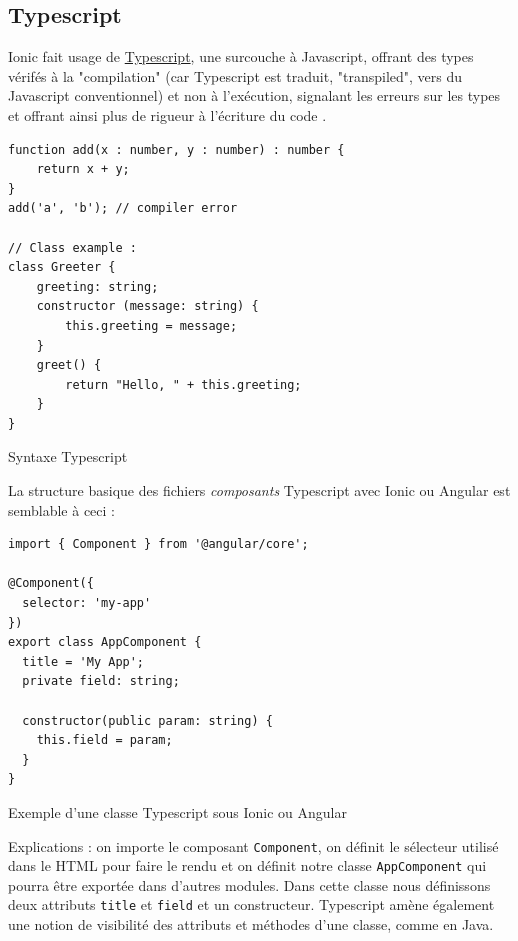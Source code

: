 \documentclass[a4paper, 12pt]{article}
\newenvironment{code}{\captionsetup{type=listing}}{}
\begin{document}
\subsection{Typescript}
Ionic fait usage de \href{http://www.typescriptlang.org/}{Typescript}, une surcouche à Javascript, offrant des types
vérifés à la "compilation" (car Typescript est traduit, "transpiled", vers du Javascript conventionnel) et non à
l'exécution, signalant les erreurs sur les types et offrant ainsi plus de rigueur à l'écriture du code \cite{ref12}.
\begin{code}
    \begin{verbatim}
function add(x : number, y : number) : number {
    return x + y;
}
add('a', 'b'); // compiler error

// Class example :
class Greeter {
    greeting: string;
    constructor (message: string) {
        this.greeting = message;
    }
    greet() {
        return "Hello, " + this.greeting;
    }
}
    \end{verbatim}
    \caption{Syntaxe Typescript}
\end{code}
La structure basique des fichiers \textit{composants} Typescript avec Ionic ou Angular est semblable à ceci :
\\
\begin{code}
    \begin{verbatim}
import { Component } from '@angular/core';

@Component({
  selector: 'my-app'
})
export class AppComponent {
  title = 'My App';
  private field: string;

  constructor(public param: string) {
    this.field = param;
  }
}
    \end{verbatim}
    \caption{Exemple d'une classe Typescript sous Ionic ou Angular}
\end{code}
Explications : on importe le composant \texttt{Component}, on définit le sélecteur utilisé dans le HTML
pour faire le rendu et on définit notre classe \texttt{AppComponent} qui pourra être exportée dans
d'autres modules. Dans cette classe nous définissons deux attributs \texttt{title} et
\texttt{field} et un constructeur. Typescript amène également une notion de visibilité des attributs 
et méthodes d'une classe, comme en Java.
\end{document}
